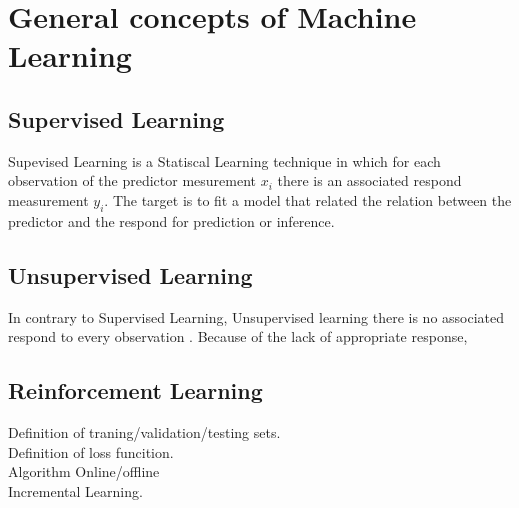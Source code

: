 \documentclass[11pt]{article}
\begin{document}
\section{General concepts of Machine Learning}
\subsection{Supervised Learning}
Supevised Learning is a Statiscal Learning technique in which for each observation of the predictor mesurement $x_i$ there is an associated respond measurement $y_i$.\cite[p. 26]{james_introduction_2013} The target is to fit a model that related the relation between the predictor and the respond for prediction or inference.
\subsection{Unsupervised Learning}
In contrary to Supervised Learning, Unsupervised learning there is no associated respond to every observation \cite[p. 27]{james_introduction_2013}. Because of the lack of appropriate response, 
\subsection{Reinforcement Learning}
Definition of traning/validation/testing sets.\\
Definition of loss funcition.\\
Algorithm Online/offline\\
Incremental Learning.\\
\end{document}
